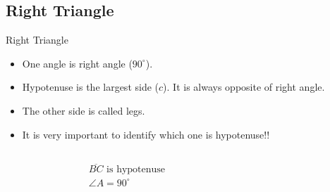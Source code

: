\subsection{Right Triangle}
\begin{frame}{Right Triangle}
    \begin{itemize}
        \item One angle is right angle ($90^\circ$).
        \item Hypotenuse is the largest side ($c$). It is always opposite of right angle.
        \item The other side is called legs.
        \item \alert{It is very important to identify which one is hypotenuse!!}
    \end{itemize}
    \begin{columns}
        \begin{figure}[H]
            \centering
            \label{fig:right_triangle}
        \end{figure}
        \begin{align*}
            & \text{$\overline{BC}$ is hypotenuse}
            \\
            & \angle A = 90^\circ
        \end{align*}
    \end{columns}    
\end{frame}
